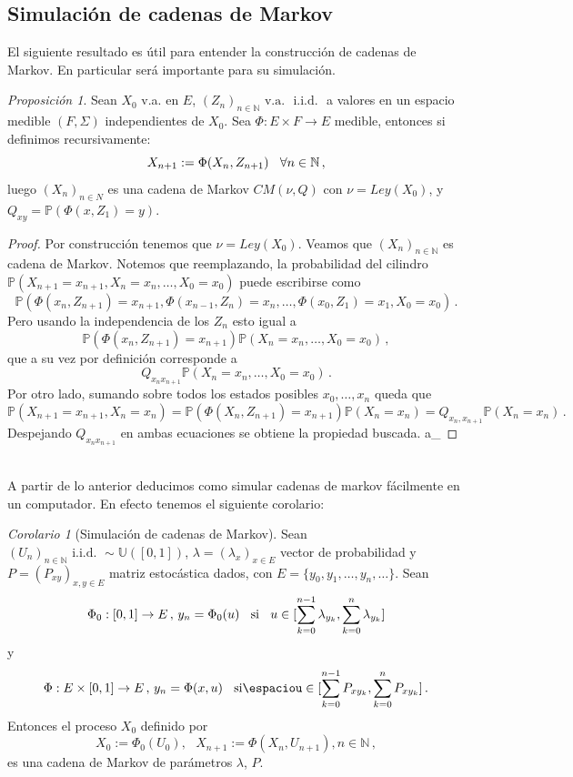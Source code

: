 \documentclass[letterpaper,11pt]{article} %
\def\espacio{\hspace{.25cm}\,}
\theoremstyle{defbreak}
\theoremstyle{propbreak}
\theoremstyle{remark}
\theoremstyle{break}
\newtheorem{proposition}{Proposición}[subsection]
\newtheorem{corolary}{Corolario}[subsection]
\def\P{\mathbb{P}}
\def\N{\mathbb{N}}
\def\unif{\mathbb{U}([0,1])}
\def\iid{\mbox{ i.i.d. }}
\def\gris{\color{mygray}}
\def\negro{\color{black}}
\def\findem{\null\hfill\color{white}a\color{black}_\square}
\def\xcm{(X_n)_{n\in N}}
\begin{document}
\subsection{Simulación de cadenas de Markov}
El siguiente resultado es útil para entender la construcción de cadenas de Markov. En particular será importante para su simulación.
\begin{proposition}
\label{propsimmarkov}
Sean $X_0$ v.a. en $E$, $(Z_n)_{n\in\N}\mbox{ v.a. }\iid$ a valores en un espacio medible $(F,\Sigma)$ independientes de $X_0$. Sea $\Phi:E\times F\to E$ medible, entonces si definimos recursivamente:
$$X_{n+1}:=\Phi(X_n,Z_{n+1}) \espacio \forall n\in\N \, ,$$
luego $\xcm$ es una cadena de Markov $CM(\nu,Q)$ con $\nu=Ley(X_0)$, y $Q_{xy}=\P(\Phi(x,Z_1)=y)$.
\end{proposition}
\begin{proof} \newline
\gris
Por construcción tenemos que $\nu=Ley(X_0)$. \newline Veamos que $(X_n)_{n\in\N}$ es cadena de Markov. Notemos que reemplazando, la probabilidad del cilindro $\P(X_{n+1}=x_{n+1},X_n=x_n,\dots,X_0=x_0)$ puede escribirse como
$$ \P(\Phi(x_n,Z_{n+1})=x_{n+1},\Phi(x_{n-1},Z_n)=x_n,\dots,\Phi(x_0,Z_1)=x_1,X_0=x_0) \, .$$
Pero usando la independencia de los $Z_n$ esto igual a 
$$ \P(\Phi(x_n,Z_{n+1})=x_{n+1})\P(X_n=x_n,\dots,X_0=x_0) \, ,$$
que a su vez por definición corresponde a
$$ Q_{x_nx_{n+1}}\P(X_n=x_n,\dots,X_0=x_0)\, . $$
Por otro lado, sumando sobre todos los estados posibles $x_0,\dots,x_n$ queda que 
$$ \P(X_{n+1}=x_{n+1},X_n=x_n) = \P(\Phi(X_n,Z_{n+1})=x_{n+1})\P(X_n=x_n)=Q_{x_n,x_{n+1}}\P(X_n=x_n) \, .$$
Despejando $Q_{x_nx_{n+1}}$ en ambas ecuaciones se obtiene la propiedad buscada. \findem
\negro
\end{proof}
\vspace{.5cm}\\
A partir de lo anterior deducimos como simular cadenas de markov fácilmente en un computador. En efecto tenemos el siguiente corolario:
\begin{corolary}[Simulación de cadenas de Markov]
Sean $(U_n)_{n\in\N} \iid \sim\unif$, $\lambda=(\lambda_x)_{x\in E}$ vector de probabilidad y $P=(P_{xy})_{x,y\in E}$ matriz estocástica dados, con $E=\{y_0,y_1,\dots,y_n,\dots\}$. %
Sean 
$$ \Phi_0:[0,1]\to E \, ,\, y_n=\Phi_0(u)\espacio\mbox{si}\espacio u\in[\displaystyle\sum^{n-1}_{k=0}\lambda_{y_k},\sum^n_{k=0}\lambda_{y_k}]$$
y
$$ \Phi:E\times[0,1]\to E\,,\,y_n=\Phi(x,u)\espacio\mbox{si}\espaciou\in[\displaystyle\sum^{n-1}_{k=0}P_{xy_k},\sum^n_{k=0}P_{xy_k}] \, .$$
Entonces el proceso $X_0$ definido por
$$ X_0:=\Phi_0(U_0), \mbox{ }X_{n+1}:=\Phi(X_n,U_{n+1}), n\in\N\, ,$$
es una cadena de Markov de parámetros $\lambda$, $P$.
\end{corolary}
\end{document}
